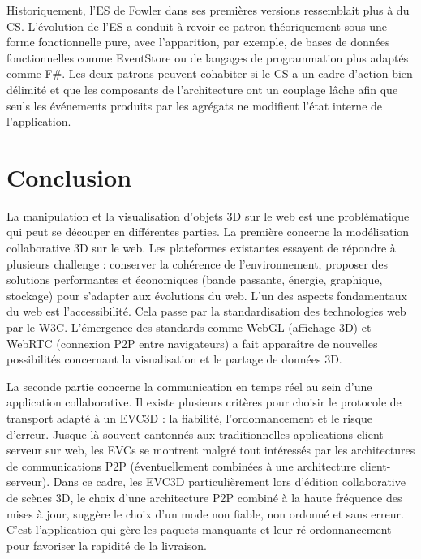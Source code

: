 Historiquement, l'\gls{ES} de Fowler dans ses premières versions ressemblait plus 
à du \gls{CS}. L'évolution de l'\gls{ES} a conduit à revoir ce patron théoriquement 
sous une forme fonctionnelle pure, avec l'apparition, par exemple, de bases de données fonctionnelles comme EventStore ou de langages de programmation plus adaptés comme F\#. Les deux 
patrons peuvent cohabiter si le \gls{CS} a un cadre d'action bien délimité 
et que les composants de l'architecture ont un couplage lâche afin que seuls les 
événements produits par les agrégats ne modifient l'état interne de l'application. 

\section{Conclusion}

La manipulation et la visualisation d'objets \gls{3D} sur le web est une 
problématique 
qui peut se découper en différentes parties.
La première concerne la modélisation collaborative \gls{3D} sur le web. Les 
plateformes 
existantes essayent de répondre à plusieurs challenge : conserver la cohérence 
de l'environnement, proposer des solutions performantes et économiques (bande 
passante, énergie, graphique, stockage)  pour s'adapter aux évolutions du web.
L'un des aspects fondamentaux du web est l'accessibilité. Cela passe par la 
standardisation des technologies web par le \gls{W3C}.  L'émergence des 
standards comme WebGL (affichage \gls{3D}) et WebRTC (connexion P2P entre 
navigateurs) a fait apparaître de nouvelles possibilités concernant la visualisation 
et le partage de données \gls{3D}. 


La seconde partie concerne la communication en temps réel au sein d'une 
application collaborative. Il existe plusieurs critères pour choisir le protocole de 
transport adapté à un \gls{EVC3D} : la fiabilité, l'ordonnancement et le risque 
d'erreur. 
Jusque là souvent cantonnés aux traditionnelles 
applications client-serveur sur web, les \glspl{EVC} se montrent malgré tout 
intéressés par les architectures de communications P2P (éventuellement 
combinées à une architecture client-serveur). Dans ce cadre, les \gls{EVC3D} 
particulièrement lors d'édition collaborative de scènes \gls{3D}, le choix d'une 
architecture \gls{P2P} combiné à la haute fréquence des mises à jour, suggère le 
choix d'un mode non fiable, non ordonné et sans erreur. C'est l'application qui gère 
les 
paquets manquants et leur ré-ordonnancement pour favoriser la rapidité 
de la livraison.

